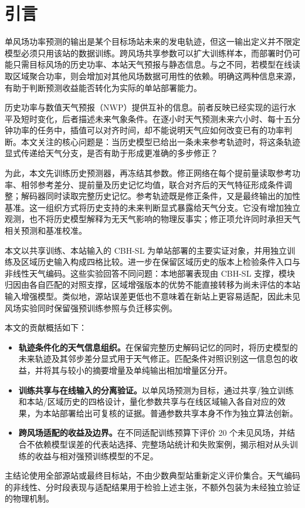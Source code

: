 \section{引言}
\label{sec:introduction}
单风场功率预测的输出是某个目标场站未来的发电轨迹，但这一输出定义并不限定模型必须只用该站的数据训练。跨风场共享参数可以扩大训练样本，而部署时仍可能只需目标风场的历史功率、本站天气预报与静态信息。与之不同，若模型在线读取区域聚合功率，则会增加对其他风场数据可用性的依赖。明确这两种信息来源，有助于判断预测收益能否转化为实际的单站部署能力。

历史功率与数值天气预报（NWP）提供互补的信息。前者反映已经实现的运行水平及短时变化，后者描述未来气象条件。在逐小时天气预测未来六小时、每十五分钟功率的任务中，插值可以对齐时间，却不能说明天气应如何改变已有的功率判断。本文关注的核心问题是：当历史模型已给出一条未来参考轨迹时，将这条轨迹显式传递给天气分支，是否有助于形成更准确的多步修正？

为此，本文先训练历史预测器，再冻结其参数。修正网络在每个提前量读取参考功率、相邻参考差分、提前量及历史记忆均值，联合对齐后的天气特征形成条件调整；解码器同时读取完整历史记忆。参考轨迹既是修正条件，又是最终输出的加性基准。这一组织方式将历史支持的未来判断显式暴露给天气分支。它没有增加独立观测，也不将历史模型解释为无天气影响的物理反事实；修正项允许同时承担天气相关预测和基准校准。

本文以共享训练、本站输入的 CBH-SL 为单站部署的主要实证对象，并用独立训练及区域历史输入构成四格比较。进一步在保留区域历史的版本上检验条件入口与非线性天气编码。这些实验回答不同问题：本地部署表现由 CBH-SL 支撑，模块归因由各自匹配的对照支撑，区域增强版本的优势不能直接转移为尚未评估的本站输入增强模型。类似地，源站误差更低也不意味着在新站上更容易适配，因此未见风场实验同时保留强预训练参照与负迁移实例。

本文的贡献概括如下：
\begin{itemize}
 \item \textbf{轨迹条件化的天气信息组织。}在保留完整历史解码记忆的同时，将历史模型的未来轨迹及其邻步差分显式用于天气修正。匹配条件对照识别这一信息包的收益，并将其与较小的摘要增量及单纯输出相加增量区分开。
 \item \textbf{训练共享与在线输入的分离验证。}以单风场预测为目标，通过共享/独立训练和本站/区域历史的四格设计，量化参数共享与在线区域输入各自对应的效果，为本站部署给出可复核的证据。普通参数共享本身不作为独立算法创新。
 \item \textbf{跨风场适配的收益及边界。}在不同适配训练预算下评价 20 个未见风场，并结合不依赖模型误差的代表站选择、完整场站统计和失败案例，揭示相对从头训练的收益与相对强预训练模型的不足。
\end{itemize}
主结论使用全部源站或最终目标站，不由少数典型站重新定义评价集合。天气编码的非线性、分时段表现与适配结果用于检验上述主张，不额外包装为未经独立验证的物理机制。
